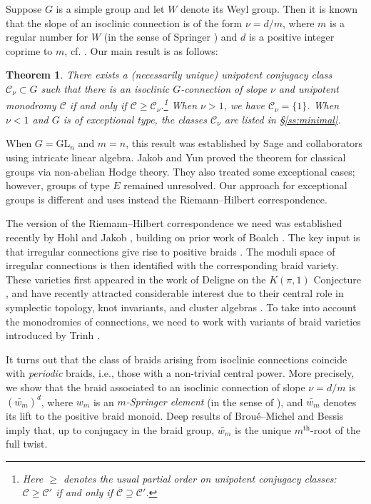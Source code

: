 \documentclass[11pt]{amsart}
\newtheorem{thm}{Theorem}
\theoremstyle{definition}
\newcommand{\GL}{\mathrm{GL}}
\newcommand{\cC}{\mathcal{C}}
\begin{document}
Suppose $G$ is a simple group and let $W$ denote its Weyl group. Then it is known that the slope of an isoclinic connection is of the form $\nu=d/m$, where $m$ is a regular number for $W$ (in the sense of Springer \cite{Springer}) and $d$ is a positive integer coprime to $m$, cf. 
 \cite[Lemma 2.2]{JY}. Our main result is as follows: 

\begin{thm} \label{t:main} There exists a (necessarily unique) unipotent conjugacy class $\mathcal{C}_\nu\subset G$ such that there is an isoclinic $G$-connection of slope $\nu$ and unipotent monodromy $\cC$ if and only if $\cC \ge \mathcal{C}_\nu$.\footnote{Here $\geq$ denotes the usual partial order on unipotent conjugacy classes: $\cC\geq \cC'$ if and only if $\overline{\cC}\supseteq \cC'$.} When $\nu>1$, we have $\mathcal{C}_\nu=\{1\}$. When $\nu<1$ and $G$ is of exceptional type, the classes $\mathcal{C}_\nu$ are listed in \S \ref{ss:minimal}.
\end{thm}

When $G=\GL_n$ and $m=n$, this result was established by Sage and collaborators \cite{SageEtAl, LivesaySageNguyen} using intricate linear algebra. Jakob and Yun \cite{JY} proved the theorem for classical groups via non-abelian Hodge theory. They also treated some exceptional cases; however, groups of type $E$ remained unresolved. Our approach for exceptional groups is different and uses instead the Riemann--Hilbert correspondence. 

The version of the Riemann--Hilbert correspondence we need was established recently by Hohl and Jakob \cite{HJ}, building on prior work of Boalch \cite{BoalchTopology}. The key input is that irregular connections give rise to positive braids \cite{BBAMY}. The moduli space of irregular connections is then identified with the corresponding braid variety. 
These varieties first appeared in the work of Deligne on the $K(\pi,1)$ Conjecture \cite{Deligne}, and have recently attracted considerable interest due to their central role in symplectic topology, knot invariants, and cluster algebras \cite{STZ, Trinh, GorskyKivinenSimental, IanEtAl, Mellit, GLSB}. To take into account the monodromies of connections, we need to work with variants of braid varieties introduced by Trinh \cite{Trinh}. 

It turns out that the class of braids arising from isoclinic connections coincide with \emph{periodic} braids, i.e., those with a non-trivial central power. 
More precisely, we show that the braid associated to an isoclinic connection of slope $\nu=d/m$ is $(\widetilde{w_m})^d$, where $w_m$ is an \emph{$m$-Springer element} (in the sense of \cite{BM}), and $\widetilde{w_m}$ denotes its lift to the positive braid monoid. Deep results of Brou\'{e}--Michel and Bessis \cite{BM, BessisKPi1} imply that, up to conjugacy in the braid group, $\widetilde{w_m}$ is the unique $m^{\text{th}}$-root of the full twist.
\end{document}
